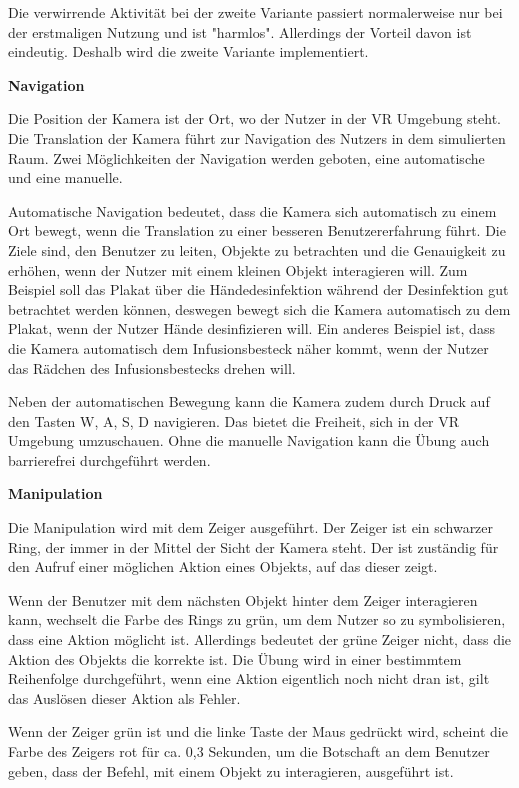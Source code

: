   Die verwirrende Aktivität bei der zweite Variante passiert normalerweise nur bei der erstmaligen Nutzung und ist "harmlos". Allerdings der Vorteil davon ist eindeutig. Deshalb wird die zweite Variante implementiert.
  
  \textbf{Navigation}
  
  Die Position der Kamera ist der Ort, wo der Nutzer in der VR Umgebung steht. Die Translation der Kamera führt zur Navigation des Nutzers in dem simulierten Raum. Zwei Möglichkeiten der Navigation werden geboten, eine automatische und eine manuelle.
  
  Automatische Navigation bedeutet, dass die Kamera sich automatisch zu einem Ort bewegt, wenn die Translation zu einer besseren Benutzererfahrung führt. Die Ziele sind, den Benutzer zu leiten, Objekte zu betrachten und die Genauigkeit zu erhöhen, wenn der Nutzer mit einem kleinen Objekt interagieren will. Zum Beispiel soll das Plakat über die Händedesinfektion während der Desinfektion gut betrachtet werden können, deswegen bewegt sich die Kamera automatisch zu dem Plakat, wenn der Nutzer Hände desinfizieren will. Ein anderes Beispiel ist, dass die Kamera automatisch dem Infusionsbesteck näher kommt, wenn der Nutzer das Rädchen des Infusionsbestecks drehen will.

  Neben der automatischen Bewegung kann die Kamera zudem durch Druck auf den Tasten W, A, S, D navigieren. Das bietet die Freiheit, sich in der VR Umgebung umzuschauen. Ohne die manuelle Navigation kann die Übung auch barrierefrei durchgeführt werden.
  
  \textbf{Manipulation}
  
  Die Manipulation wird mit dem Zeiger ausgeführt. Der Zeiger ist ein schwarzer Ring, der immer in der Mittel der Sicht der Kamera steht. Der ist zuständig für den Aufruf einer möglichen Aktion eines Objekts, auf das dieser zeigt.
  
  Wenn der Benutzer mit dem nächsten Objekt hinter dem Zeiger interagieren kann, wechselt die Farbe des Rings zu grün, um dem Nutzer so zu symbolisieren, dass eine Aktion möglicht ist. Allerdings bedeutet der grüne Zeiger nicht, dass die Aktion des Objekts die korrekte ist. Die Übung wird in einer bestimmtem Reihenfolge durchgeführt, wenn eine Aktion eigentlich noch nicht dran ist, gilt das Auslösen dieser Aktion als Fehler.
  
  Wenn der Zeiger grün ist und die linke Taste der Maus gedrückt wird, scheint die Farbe des Zeigers rot für ca. 0,3 Sekunden, um die Botschaft an dem Benutzer geben, dass der Befehl, mit einem Objekt zu interagieren, ausgeführt ist. 
  
